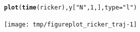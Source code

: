 \documentclass{beamer}\usepackage[]{graphicx}\usepackage[]{color}
\makeatletter
\newcommand{\hlnum}[1]{\textcolor[rgb]{0.686,0.059,0.569}{#1}}%
\newcommand{\hlstr}[1]{\textcolor[rgb]{0.192,0.494,0.8}{#1}}%
\newcommand{\hlstd}[1]{\textcolor[rgb]{0.345,0.345,0.345}{#1}}%
\newcommand{\hlkwc}[1]{\textcolor[rgb]{0.333,0.667,0.333}{#1}}%
\newcommand{\hlkwd}[1]{\textcolor[rgb]{0.737,0.353,0.396}{\textbf{#1}}}%
\newenvironment{kframe}{%
 \def\at@end@of@kframe{}%
 \ifinner\ifhmode%
  \def\at@end@of@kframe{\end{minipage}}%
  \begin{minipage}{\columnwidth}%
 \fi\fi%
 \def\FrameCommand##1{\hskip\@totalleftmargin \hskip-\fboxsep
 \colorbox{shadecolor}{##1}\hskip-\fboxsep
     \hskip-\linewidth \hskip-\@totalleftmargin \hskip\columnwidth}%
 \MakeFramed {\advance\hsize-\width
   \@totalleftmargin\z@ \linewidth\hsize
   \@setminipage}}%
 {\par\unskip\endMakeFramed%
 \at@end@of@kframe}
\newenvironment{knitrout}{}{} %
\makeatother
\begin{document}
\begin{frame}[fragile]

\begin{knitrout}\small
{}\color{fgcolor}\begin{kframe}
\begin{alltt}
\hlkwd{plot}\hlstd{(}\hlkwd{time}\hlstd{(ricker),y[}\hlstr{"N"}\hlstd{,}\hlnum{1}\hlstd{,],}\hlkwc{type}\hlstd{=}\hlstr{"l"}\hlstd{)}
\end{alltt}
\end{kframe}
\end{knitrout}


\begin{knitrout}\small
{}\color{fgcolor}

{\centering \texttt{[image: tmp/figureplot\_ricker\_traj-1]} 

}



\end{knitrout}

\end{frame}
\end{document}
